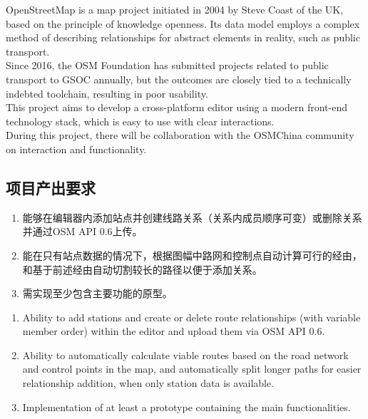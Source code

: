 \documentclass{beamer}
\begin{document}
\begin{frame}
	\quad \quad OpenStreetMap is a map project initiated in 2004 by Steve Coast of the UK, based on the principle of knowledge openness. 
	Its data model employs a complex method of describing relationships for abstract elements in reality, such as public transport. \\
	\quad \quad Since 2016, the OSM Foundation has submitted projects related to public transport to GSOC annually, 
	but the outcomes are closely tied to a technically indebted toolchain, resulting in poor usability. \\
	\quad \quad This project aims to develop a cross-platform editor using a modern front-end technology stack, which is easy to use with clear interactions. \\
	\quad \quad During this project, there will be collaboration with the OSMChina community on interaction and functionality.
\end{frame}

\subsection{项目产出要求}

\begin{frame}
	\begin{enumerate}
		\item 能够在编辑器内添加站点并创建线路关系（关系内成员顺序可变）或删除关系并通过OSM API 0.6上传。
		\item 能在只有站点数据的情况下，根据图幅中路网和控制点自动计算可行的经由，和基于前述经由自动切割较长的路径以便于添加关系。
		\item 需实现至少包含主要功能的原型。
	\end{enumerate}
\end{frame}

\begin{frame}
	\begin{enumerate}
		\item Ability to add stations and create or delete route relationships (with variable member order) within the editor and upload them via OSM API 0.6.
		\item Ability to automatically calculate viable routes based on the road network and control points in the map, and automatically split longer paths for easier relationship addition, when only station data is available.
		\item Implementation of at least a prototype containing the main functionalities.
	\end{enumerate}
\end{frame}
\end{document}
